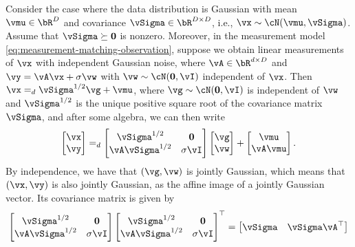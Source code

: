 \documentclass[../../book-main.tex]{subfiles}
\begin{document}
\begin{example}\label{example:denoising-conditional-gaussian}
  Consider the case where the data distribution is Gaussian with mean $\vmu \in
  \bR^D$ and
  covariance $\vSigma \in \bR^{D \times D}$, i.e., $\vx \sim \cN(\vmu, \vSigma)$.
  Assume that $\vSigma \succeq \Zero$ is nonzero.
  Moreover, in the measurement model \eqref{eq:measurement-matching-observation},
  suppose we obtain linear measurements of $\vx$ with independent Gaussian
  noise, where $\vA \in \bR^{d \times D}$ and $\vy = \vA \vx + \sigma \vw$
  with $\vw \sim \cN(\Zero, \vI)$ independent of $\vx$.
  Then $\vx =_{d} \vSigma^{1/2} \vg + \vmu$, where $\vg \sim \cN(\Zero, \vI)$ is
  independent of $\vw$ and $\vSigma^{1/2}$ is the unique positive square root of
  the covariance matrix $\vSigma$, and
  after some algebra, we can then write
  \begin{equation*}
    \begin{bmatrix}
      \vx \\
      \vy
    \end{bmatrix}
    =_{d}
    \begin{bmatrix}
      \vSigma^{1/2} & \Zero \\
      \vA \vSigma^{1/2} & \sigma \vI
    \end{bmatrix}
    \begin{bmatrix}
      \vg \\
      \vw
    \end{bmatrix}
    +
    \begin{bmatrix}
      \vmu \\
      \vA\vmu
    \end{bmatrix}.
  \end{equation*}
  By independence, we have that $(\vg, \vw)$ is jointly Gaussian, which means that
  $(\vx, \vy)$ is also jointly Gaussian, as the affine image of a jointly Gaussian
  vector.
  Its covariance matrix is given by
  \begin{equation*}
    \begin{bmatrix}
      \vSigma^{1/2} & \Zero \\
      \vA \vSigma^{1/2} & \sigma \vI
    \end{bmatrix}
    \begin{bmatrix}
      \vSigma^{1/2} & \Zero \\
      \vA \vSigma^{1/2} & \sigma \vI
    \end{bmatrix}^\top
    =
    \begin{bmatrix}
      \vSigma & \vSigma \vA^\top \\

\end{bmatrix}
\end{equation*}
\end{example}
\end{document}
